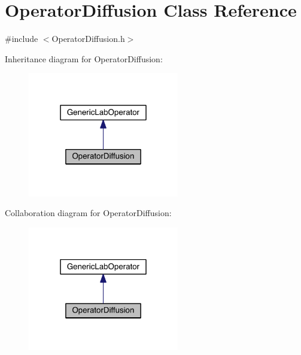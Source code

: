 \hypertarget{class_operator_diffusion}{}\section{Operator\+Diffusion Class Reference}
\label{class_operator_diffusion}


{\ttfamily \#include $<$Operator\+Diffusion.\+h$>$}



Inheritance diagram for Operator\+Diffusion\+:\nopagebreak
\begin{figure}[H]
\begin{center}
\leavevmode
\includegraphics[width=187pt]{de/d0e/class_operator_diffusion__inherit__graph}
\end{center}
\end{figure}


Collaboration diagram for Operator\+Diffusion\+:\nopagebreak
\begin{figure}[H]
\begin{center}
\leavevmode
\includegraphics[width=187pt]{d0/d16/class_operator_diffusion__coll__graph}
\end{center}
\end{figure}
